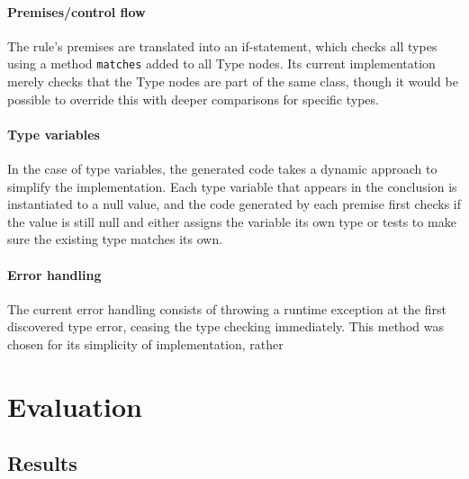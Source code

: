 \documentclass[nofilelist]{cslthse-msc}
\begin{document}
\subsubsection{Premises/control flow}
The rule's premises are translated into an if-statement, which checks all types using a method \verb|matches| added to all Type nodes.
Its current implementation merely checks that the Type nodes are part of the same class, though it would be possible to override this with deeper comparisons for specific types.

\subsubsection{Type variables}
In the case of type variables, the generated code takes a dynamic approach to simplify the implementation.
Each type variable that appears in the conclusion is instantiated to a null value, and the code generated by each premise first checks if the value is still null and either assigns the variable its own type or tests to make sure the existing type matches its own.

\subsubsection{Error handling}
The current error handling consists of throwing a runtime exception at the first discovered type error, ceasing the type checking immediately.
This method was chosen for its simplicity of implementation, rather 


\chapter{Evaluation} %
\section{Results} %
\end{document}
